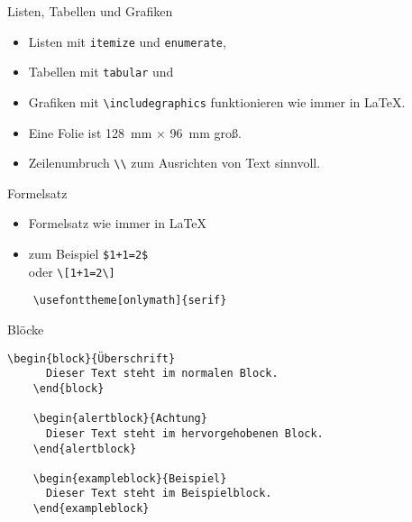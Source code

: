\begin{Frame}[fragile]{Listen, Tabellen und Grafiken}
  \begin{itemize}
    \item Listen mit \lstinline-itemize- und \lstinline-enumerate-,
    \item Tabellen mit \lstinline-tabular- und
    \item Grafiken mit \lstinline-\includegraphics- funktionieren wie immer in \LaTeX.
  \end{itemize}

  \xxx

  \begin{itemize}
    \item Eine Folie ist 128~mm $\times$ 96~mm groß.
    \item Zeilenumbruch \lstinline-\\- zum Ausrichten von Text sinnvoll.
  \end{itemize}
\end{Frame}

\begin{Frame}[fragile]{Formelsatz}
  \begin{itemize}
    \item Formelsatz wie immer in \LaTeX
    \item zum Beispiel \lstinline-$1+1=2$-\\
      oder \lstinline-\[1+1=2\]-
  \end{itemize}

  \xxx

  \begin{lstlisting}[gobble=4]
    % Formeln mit Serifen setzen
    \usefonttheme[onlymath]{serif}
  \end{lstlisting}
\end{Frame}

\begin{Frame}[fragile]{Blöcke}
  \begin{lstlisting}[gobble=4]
    \begin{block}{Überschrift}
      Dieser Text steht im normalen Block.
    \end{block}

    \begin{alertblock}{Achtung}
      Dieser Text steht im hervorgehobenen Block.
    \end{alertblock}

    \begin{exampleblock}{Beispiel}
      Dieser Text steht im Beispielblock.
    \end{exampleblock}
  \end{lstlisting}
\end{Frame}


